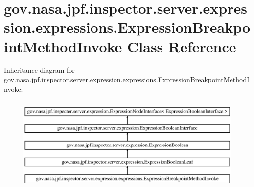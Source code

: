 \hypertarget{classgov_1_1nasa_1_1jpf_1_1inspector_1_1server_1_1expression_1_1expressions_1_1_expression_breakpoint_method_invoke}{}\section{gov.\+nasa.\+jpf.\+inspector.\+server.\+expression.\+expressions.\+Expression\+Breakpoint\+Method\+Invoke Class Reference}
\label{classgov_1_1nasa_1_1jpf_1_1inspector_1_1server_1_1expression_1_1expressions_1_1_expression_breakpoint_method_invoke}
Inheritance diagram for gov.\+nasa.\+jpf.\+inspector.\+server.\+expression.\+expressions.\+Expression\+Breakpoint\+Method\+Invoke\+:\begin{figure}[H]
\begin{center}
\leavevmode
\includegraphics[height=4.827586cm]{classgov_1_1nasa_1_1jpf_1_1inspector_1_1server_1_1expression_1_1expressions_1_1_expression_breakpoint_method_invoke}
\end{center}
\end{figure}
